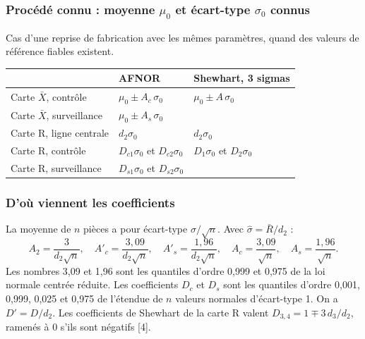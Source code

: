 \documentclass[11pt,a4paper]{article}
\newcommand{\Rb}{\bar{R}}
\begin{document}
\subsubsection{Procédé connu : moyenne \texorpdfstring{$\mu_0$}{mu0} et écart-type \texorpdfstring{$\sigma_0$}{sigma0} connus}
Cas d'une reprise de fabrication avec les mêmes paramètres, quand des valeurs de référence fiables existent.
\begin{center}\small
\renewcommand{\arraystretch}{1.45}
\begin{tabular}{@{}lll@{}}\toprule
 & \textbf{AFNOR} & \textbf{Shewhart, 3 sigmas}\\\midrule
Carte $\bar X$, contrôle & $\mu_0\pm A_c\,\sigma_0$ & $\mu_0\pm A\,\sigma_0$\\
Carte $\bar X$, surveillance & $\mu_0\pm A_s\,\sigma_0$ & \\
Carte R, ligne centrale & $d_2\sigma_0$ & $d_2\sigma_0$\\
Carte R, contrôle & $D_{c1}\sigma_0$ et $D_{c2}\sigma_0$ & $D_1\sigma_0$ et $D_2\sigma_0$\\
Carte R, surveillance & $D_{s1}\sigma_0$ et $D_{s2}\sigma_0$ & \\\bottomrule
\end{tabular}
\end{center}

\subsubsection{D'où viennent les coefficients}
La moyenne de $n$ pièces a pour écart-type $\sigma/\sqrt n$. Avec $\hat\sigma=\Rb/d_2$ :
\[
A_2=\frac3{d_2\sqrt n},\quad A'_c=\frac{3{,}09}{d_2\sqrt n},\quad A'_s=\frac{1{,}96}{d_2\sqrt n},\quad A_c=\frac{3{,}09}{\sqrt n},\quad A_s=\frac{1{,}96}{\sqrt n}.
\]
Les nombres 3,09 et 1,96 sont les quantiles d'ordre 0,999 et 0,975 de la loi normale centrée réduite. Les coefficients $D_c$ et $D_s$ sont les quantiles d'ordre 0,001, 0,999, 0,025 et 0,975 de l'étendue de $n$ valeurs normales d'écart-type 1. On a $D'=D/d_2$. Les coefficients de Shewhart de la carte R valent $D_{3,4}=1\mp3\,d_3/d_2$, ramenés à 0 s'ils sont négatifs [4].
\end{document}
